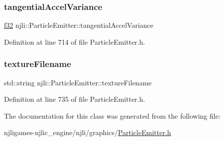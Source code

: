 \subsubsection{\texorpdfstring{tangential\+Accel\+Variance}{tangentialAccelVariance}}
{\footnotesize\ttfamily \mbox{\hyperlink{_util_8h_a5f6906312a689f27d70e9d086649d3fd}{f32}} njli\+::\+Particle\+Emitter\+::tangential\+Accel\+Variance\hspace{0.3cm}{\ttfamily [private]}}



Definition at line 714 of file Particle\+Emitter.\+h.

\mbox{\label{classnjli_1_1_particle_emitter_abcf96d8ca5dff9419dc52a4641e485e5}} 
\subsubsection{\texorpdfstring{texture\+Filename}{textureFilename}}
{\footnotesize\ttfamily std\+::string njli\+::\+Particle\+Emitter\+::texture\+Filename\hspace{0.3cm}{\ttfamily [private]}}



Definition at line 735 of file Particle\+Emitter.\+h.



The documentation for this class was generated from the following file\+:\begin{DoxyCompactItemize}
\item 
njligames-\/njlic\+\_\+engine/njli/graphics/\mbox{\hyperlink{_particle_emitter_8h}{Particle\+Emitter.\+h}}\end{DoxyCompactItemize}
